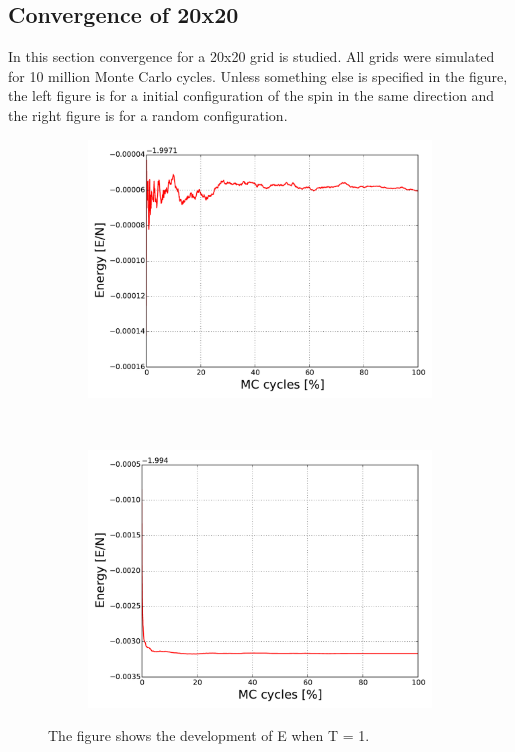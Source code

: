 \pagebreak
\subsection{Convergence of 20x20}

In this section convergence for a 20x20 grid is studied. All grids were simulated for 10 million Monte Carlo cycles. Unless something else is specified in the figure, the left figure is for a initial configuration of the spin in the same direction and the right figure is for a random configuration. 

\begin{figure}[H]
    \centering
    \begin{subfigure}{0.5\textwidth}
        \centering
        \includegraphics[width=\linewidth]{result/bilder/20x20/E-N20-T1}
        \caption{}
    \end{subfigure}%
    ~ 
    \begin{subfigure}{0.5\textwidth}
        \centering
        \includegraphics[width=\linewidth]{result/bilder/20x20/E-N20-T1-RNG}
        \caption{}
    \end{subfigure}
    \caption{The figure shows the development of E when T = 1. }
    \label{fig:}
\end{figure}

